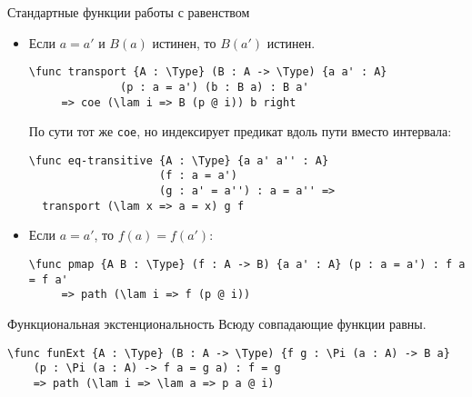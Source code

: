 \documentclass[aspectratio=169,dvipsnames,usenames]{beamer}
\begin{document}
\begin{frame}[fragile]{Стандартные функции работы с равенством}
\begin{itemize}
\item Если $a = a'$ и $B(a)$ истинен, то $B(a')$ истинен.

\small\color[HTML]{025002}\begin{verbatim}\func transport {A : \Type} (B : A -> \Type) {a a' : A} 
              (p : a = a') (b : B a) : B a'
     => coe (\lam i => B (p @ i)) b right\end{verbatim}
\normalsize\color{black}

По сути тот же \verb!coe!, но индексирует предикат вдоль пути вместо интервала:

\small\color[HTML]{025002}\begin{verbatim}\func eq-transitive {A : \Type} {a a' a'' : A}
                    (f : a = a')
                    (g : a' = a'') : a = a'' =>
  transport (\lam x => a = x) g f
\end{verbatim}\normalsize
\color{black}

\item Если $a = a'$, то $f(a) = f(a')$:

\small\color[HTML]{025002}\begin{verbatim}
\func pmap {A B : \Type} (f : A -> B) {a a' : A} (p : a = a') : f a = f a' 
     => path (\lam i => f (p @ i))
\end{verbatim}\normalsize
\color{black}
\end{itemize}

\end{frame}

\begin{frame}[fragile]{Функциональная экстенциональность}
Всюду совпадающие функции равны.

\small\color[HTML]{025002}\begin{verbatim}\func funExt {A : \Type} (B : A -> \Type) {f g : \Pi (a : A) -> B a}
    (p : \Pi (a : A) -> f a = g a) : f = g
    => path (\lam i => \lam a => p a @ i)\end{verbatim}
\normalsize
\color{black}
\end{frame}
\end{document}
